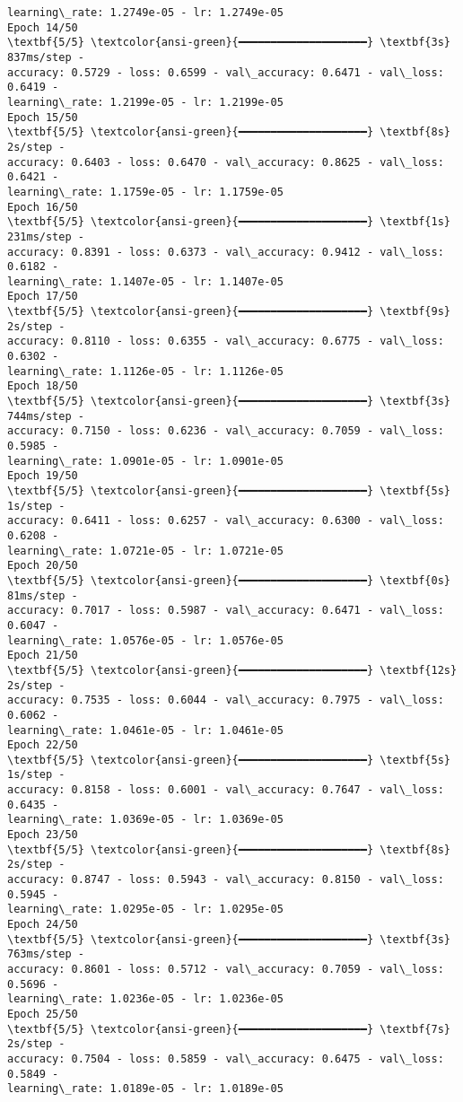 \documentclass[11pt]{article}
\begin{document}
\begin{Verbatim}[commandchars=\\\{\}]
learning\_rate: 1.2749e-05 - lr: 1.2749e-05
Epoch 14/50
\textbf{5/5} \textcolor{ansi-green}{━━━━━━━━━━━━━━━━━━━━} \textbf{3s} 837ms/step -
accuracy: 0.5729 - loss: 0.6599 - val\_accuracy: 0.6471 - val\_loss: 0.6419 -
learning\_rate: 1.2199e-05 - lr: 1.2199e-05
Epoch 15/50
\textbf{5/5} \textcolor{ansi-green}{━━━━━━━━━━━━━━━━━━━━} \textbf{8s} 2s/step -
accuracy: 0.6403 - loss: 0.6470 - val\_accuracy: 0.8625 - val\_loss: 0.6421 -
learning\_rate: 1.1759e-05 - lr: 1.1759e-05
Epoch 16/50
\textbf{5/5} \textcolor{ansi-green}{━━━━━━━━━━━━━━━━━━━━} \textbf{1s} 231ms/step -
accuracy: 0.8391 - loss: 0.6373 - val\_accuracy: 0.9412 - val\_loss: 0.6182 -
learning\_rate: 1.1407e-05 - lr: 1.1407e-05
Epoch 17/50
\textbf{5/5} \textcolor{ansi-green}{━━━━━━━━━━━━━━━━━━━━} \textbf{9s} 2s/step -
accuracy: 0.8110 - loss: 0.6355 - val\_accuracy: 0.6775 - val\_loss: 0.6302 -
learning\_rate: 1.1126e-05 - lr: 1.1126e-05
Epoch 18/50
\textbf{5/5} \textcolor{ansi-green}{━━━━━━━━━━━━━━━━━━━━} \textbf{3s} 744ms/step -
accuracy: 0.7150 - loss: 0.6236 - val\_accuracy: 0.7059 - val\_loss: 0.5985 -
learning\_rate: 1.0901e-05 - lr: 1.0901e-05
Epoch 19/50
\textbf{5/5} \textcolor{ansi-green}{━━━━━━━━━━━━━━━━━━━━} \textbf{5s} 1s/step -
accuracy: 0.6411 - loss: 0.6257 - val\_accuracy: 0.6300 - val\_loss: 0.6208 -
learning\_rate: 1.0721e-05 - lr: 1.0721e-05
Epoch 20/50
\textbf{5/5} \textcolor{ansi-green}{━━━━━━━━━━━━━━━━━━━━} \textbf{0s} 81ms/step -
accuracy: 0.7017 - loss: 0.5987 - val\_accuracy: 0.6471 - val\_loss: 0.6047 -
learning\_rate: 1.0576e-05 - lr: 1.0576e-05
Epoch 21/50
\textbf{5/5} \textcolor{ansi-green}{━━━━━━━━━━━━━━━━━━━━} \textbf{12s} 2s/step -
accuracy: 0.7535 - loss: 0.6044 - val\_accuracy: 0.7975 - val\_loss: 0.6062 -
learning\_rate: 1.0461e-05 - lr: 1.0461e-05
Epoch 22/50
\textbf{5/5} \textcolor{ansi-green}{━━━━━━━━━━━━━━━━━━━━} \textbf{5s} 1s/step -
accuracy: 0.8158 - loss: 0.6001 - val\_accuracy: 0.7647 - val\_loss: 0.6435 -
learning\_rate: 1.0369e-05 - lr: 1.0369e-05
Epoch 23/50
\textbf{5/5} \textcolor{ansi-green}{━━━━━━━━━━━━━━━━━━━━} \textbf{8s} 2s/step -
accuracy: 0.8747 - loss: 0.5943 - val\_accuracy: 0.8150 - val\_loss: 0.5945 -
learning\_rate: 1.0295e-05 - lr: 1.0295e-05
Epoch 24/50
\textbf{5/5} \textcolor{ansi-green}{━━━━━━━━━━━━━━━━━━━━} \textbf{3s} 763ms/step -
accuracy: 0.8601 - loss: 0.5712 - val\_accuracy: 0.7059 - val\_loss: 0.5696 -
learning\_rate: 1.0236e-05 - lr: 1.0236e-05
Epoch 25/50
\textbf{5/5} \textcolor{ansi-green}{━━━━━━━━━━━━━━━━━━━━} \textbf{7s} 2s/step -
accuracy: 0.7504 - loss: 0.5859 - val\_accuracy: 0.6475 - val\_loss: 0.5849 -
learning\_rate: 1.0189e-05 - lr: 1.0189e-05

\end{Verbatim}
\end{document}
